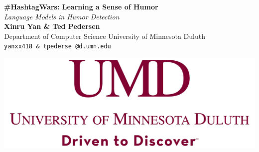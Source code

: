 \documentclass[a0,portrait]{a0poster}
\begin{document}


\begin{minipage}[b]{0.75\linewidth}
\VeryHuge \color{NavyBlue} \textbf{\#HashtagWars: Learning a Sense of Humor} \color{Black}\\ %
\huge\textit{Language Models in Humor Detection}\\[2cm] %
\huge \textbf{Xinru Yan \& Ted Pedersen}\\[0.5cm] %
\huge Department of Computer Science University of Minnesota Duluth\\[0.4cm] %
\Large \texttt{yanxx418 \& tpederse @d.umn.edu}\\
\end{minipage}
%
\begin{minipage}[b]{0.25\linewidth}
\includegraphics[width=22cm]{logo.png}\\
\end{minipage}

\vspace{1cm} %

\end{document}

